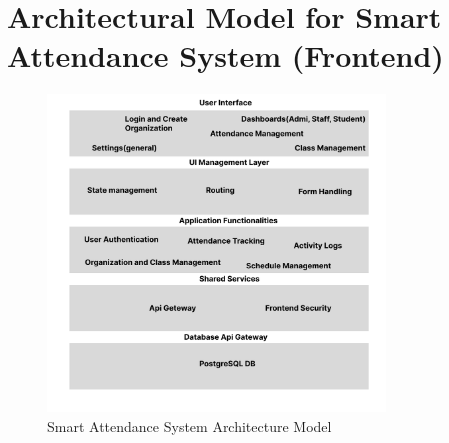 \documentclass{article}
\begin{document}
\section{Architectural Model for Smart Attendance System (Frontend)}
\begin{figure}[h]
    \centering
    \includegraphics[width=0.8\textwidth]{Arch(frontend.png}
    \caption*{\flushleft Smart Attendance System Architecture Model}
\end{figure}
\end{document}
